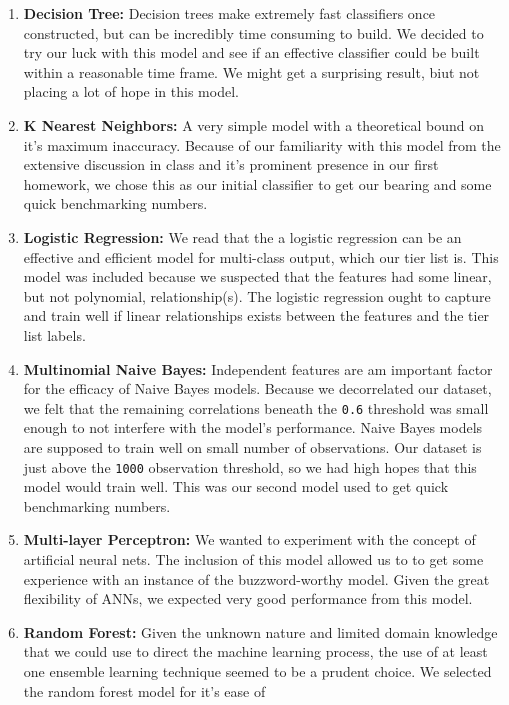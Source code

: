 \documentclass[12pt]{diazessay}
\begin{document}
\begin{enumerate}
\def\labelenumi{\arabic{enumi}.}
\item
  \textbf{Decision Tree:} Decision trees make extremely fast classifiers
  once constructed, but can be incredibly time consuming to build.
  We decided to try our luck with this model and see if an effective
  classifier could be built within a reasonable time frame.
  We might get a surprising result, biut not placing a lot of hope in this model.
\item
  \textbf{K Nearest Neighbors:} A very simple model with a theoretical bound on it's maximum inaccuracy.
  Because of our familiarity with this model from the extensive discussion in class and it's prominent presence in our first homework, we chose this as our initial classifier to get our bearing and some quick benchmarking numbers.
\item
  \textbf{Logistic Regression:} We read that the a logistic regression
  can be an effective and efficient model for multi-class output, which
  our tier list is. This model was included because we suspected that
  the features had some linear, but not polynomial, relationship(s). The
  logistic regression ought to capture and train well if linear
  relationships exists between the features and the tier list labels.
\item
  \textbf{Multinomial Naive Bayes:} Independent features are am important
  factor for the efficacy of Naive Bayes models. Because we decorrelated
  our dataset, we felt that the remaining correlations beneath the
  \texttt{0.6} threshold was small enough to not interfere with the
  model's performance. Naive Bayes models are supposed to train well on
  small number of observations. Our dataset is just above the
  \texttt{1000} observation threshold, so we had high hopes that this
  model would train well. This was our second model used to get quick
  benchmarking numbers.
\item
  \textbf{Multi-layer Perceptron:} We wanted to experiment with the
  concept of artificial neural nets. The inclusion of this model allowed
  us to to get some experience with an instance of the buzzword-worthy
  model. Given the great flexibility of ANNs, we expected very good
  performance from this model.
\item
  \textbf{Random Forest:} Given the unknown nature and limited domain
  knowledge that we could use to direct the machine learning process,
  the use of at least one ensemble learning technique seemed to be a
  prudent choice. We selected the random forest model for it's ease of

\end{enumerate}
\end{document}
